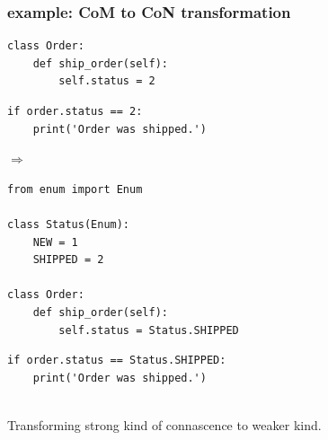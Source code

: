 \documentclass[aspectratio=169,12pt,xcolor=dvipsnames]{beamer}
\begin{document}
\begin{frame}[fragile]
  \frametitle{example: CoM to CoN transformation}
  \begin{center}
    \begin{minipage}[c]{.42\textwidth}
      \begin{verbatim}
class Order:
    def ship_order(self):
        self.status = 2
      \end{verbatim}
      \begin{verbatim}
if order.status == 2:
    print('Order was shipped.')
      \end{verbatim}
    \end{minipage}
    \begin{minipage}[c]{.03\textwidth}
      \begin{large}
        $\Rightarrow$
      \end{large}
    \end{minipage}
    \begin{minipage}[c]{.53\textwidth}
      \begin{verbatim}
from enum import Enum

class Status(Enum):
    NEW = 1
    SHIPPED = 2

class Order:
    def ship_order(self):
        self.status = Status.SHIPPED
      \end{verbatim}
      \begin{verbatim}
if order.status == Status.SHIPPED:
    print('Order was shipped.')
      \end{verbatim}
    \end{minipage}\medskip\\
    Transforming strong kind of connascence to weaker kind.
  \end{center}
\end{frame}
\end{document}
